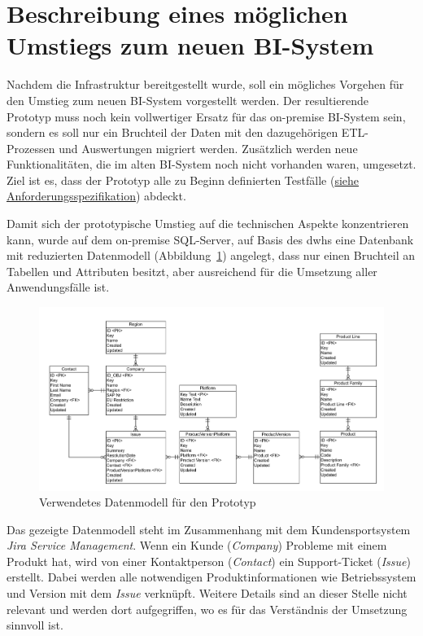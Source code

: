 \section{Beschreibung eines möglichen Umstiegs zum neuen BI-System} \label{sec:praktischeUmsetzung:Migration}
Nachdem die Infrastruktur bereitgestellt wurde, soll ein mögliches Vorgehen für den Umstieg zum neuen BI-System vorgestellt werden. Der resultierende Prototyp muss noch kein vollwertiger Ersatz für das on-premise BI-System sein, sondern es soll nur ein Bruchteil der Daten mit den dazugehörigen ETL-Prozessen und Auswertungen migriert werden. Zusätzlich werden neue Funktionalitäten, die im alten BI-System noch nicht vorhanden waren, umgesetzt. Ziel ist es, dass der Prototyp alle zu Beginn definierten Testfälle (\hyperref[sec:anforderungsspezifikation:funktionaleAnforderungen]{siehe Anforderungsspezifikation}) abdeckt.

Damit sich der prototypische Umstieg auf die technischen Aspekte konzentrieren kann, wurde auf dem on-premise SQL-Server, auf Basis des \acp{dwh} eine Datenbank mit reduzierten Datenmodell (Abbildung~\ref{fig:praktischeUmsetzung:dataModel}) angelegt, dass nur einen Bruchteil an Tabellen und Attributen besitzt, aber ausreichend für die Umsetzung aller Anwendungsfälle ist. 

\begin{figure}[htbp]
 \centering
 \includegraphics[width=\textwidth]{gfx/data_model.png}
 \caption{Verwendetes Datenmodell für den Prototyp}
\label{fig:praktischeUmsetzung:dataModel}
\end{figure}

\noindent Das gezeigte Datenmodell steht im Zusammenhang mit dem Kundensportsystem \textit{Jira Service Management}. Wenn ein Kunde (\textit{Company}) Probleme mit einem Produkt hat, wird von einer Kontaktperson (\textit{Contact}) ein Support-Ticket (\textit{Issue}) erstellt. Dabei werden alle notwendigen Produktinformationen wie Betriebssystem und Version mit dem \textit{Issue} verknüpft. Weitere Details sind an dieser Stelle nicht relevant und werden dort aufgegriffen, wo es für das Verständnis der Umsetzung sinnvoll ist.

